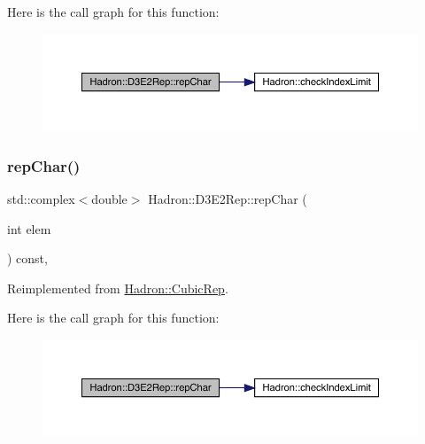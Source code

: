 Here is the call graph for this function\+:
\nopagebreak
\begin{figure}[H]
\begin{center}
\leavevmode
\includegraphics[width=350pt]{db/de8/structHadron_1_1D3E2Rep_a42a47ca21cfc9fe3d79daa1a5b697a2b_cgraph}
\end{center}
\end{figure}
\mbox{\label{structHadron_1_1D3E2Rep_a42a47ca21cfc9fe3d79daa1a5b697a2b}} 
\subsubsection{\texorpdfstring{repChar()}{repChar()}\hspace{0.1cm}{\footnotesize\ttfamily [2/2]}}
{\footnotesize\ttfamily std\+::complex$<$double$>$ Hadron\+::\+D3\+E2\+Rep\+::rep\+Char (\begin{DoxyParamCaption}\item[{int}]{elem }\end{DoxyParamCaption}) const\hspace{0.3cm}{\ttfamily [inline]}, {\ttfamily [virtual]}}



Reimplemented from \mbox{\hyperlink{structHadron_1_1CubicRep_af45227106e8e715e84b0af69cd3b36f8}{Hadron\+::\+Cubic\+Rep}}.

Here is the call graph for this function\+:
\nopagebreak
\begin{figure}[H]
\begin{center}
\leavevmode
\includegraphics[width=350pt]{db/de8/structHadron_1_1D3E2Rep_a42a47ca21cfc9fe3d79daa1a5b697a2b_cgraph}
\end{center}
\end{figure}
\mbox{\label{structHadron_1_1D3E2Rep_a941daa264ff6a6495a1bb521abe9021b}} 
